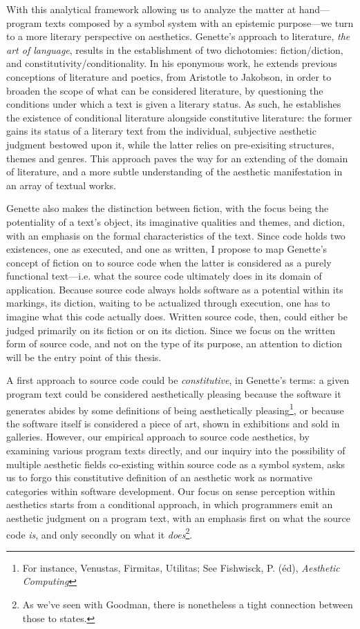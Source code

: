 With this analytical framework allowing us to analyze the matter at hand—program texts composed by a symbol system with an epistemic purpose—we turn to a more literary perspective on aesthetics. Genette's approach to literature, \emph{the art of language}, results in the establishment of two dichotomies: fiction/diction, and constitutivity/conditionality. In his eponymous work\cite{genette_fiction_1993}, he extends previous conceptions of literature and poetics, from Aristotle to Jakobson, in order to broaden the scope of what can be considered literature, by questioning the conditions under which a text is given a literary status. As such, he establishes the existence of conditional literature alongside constitutive literature: the former gains its status of a literary text from the individual, subjective aesthetic judgment bestowed upon it, while the latter relies on pre-exisiting structures, themes and genres. This approach paves the way for an extending of the domain of literature\cite{gefen_extension_2019}, and a more subtle understanding of the aesthetic manifestation in an array of textual works.

Genette also makes the distinction between fiction, with the focus being the potentiality of a text's object, its imaginative qualities and themes, and diction, with an emphasis on the formal characteristics of the text. Since code holds two existences, one as executed, and one as written, I propose to map Genette's concept of fiction on to source code when the latter is considered as a purely functional text—i.e. what the source code ultimately does in its domain of application. Because source code always holds software as a potential within its markings, its diction, waiting to be actualized through execution, one has to imagine what this code actually does. Written source code, then, could either be judged primarily on its fiction or on its diction. Since we focus on the written form of source code, and not on the type of its purpose, an attention to diction will be the entry point of this thesis.

A first approach to source code could be \emph{constitutive}, in Genette's terms: a given program text could be considered aesthetically pleasing because the software it generates abides by some definitions of being aesthetically pleasing\footnote{For instance, Venustas, Firmitas, Utilitas; See Fishwisck, P. (éd), \emph{Aesthetic Computing}}, or because the software itself is considered a piece of art, shown in exhibitions and sold in galleries. However, our empirical approach to source code aesthetics, by examining various program texts directly, and our inquiry into the possibility of multiple aesthetic fields co-existing within source code as a symbol system, asks us to forgo this constitutive definition of an aesthetic work as normative categories within software development. Our focus on sense perception within aesthetics starts from a conditional approach, in which programmers emit an aesthetic judgment on a program text, with an emphasis first on what the source code \emph{is}, and only secondly on what it \emph{does}\footnote{As we've seen with Goodman, there is nonetheless a tight connection between those to states.}.

